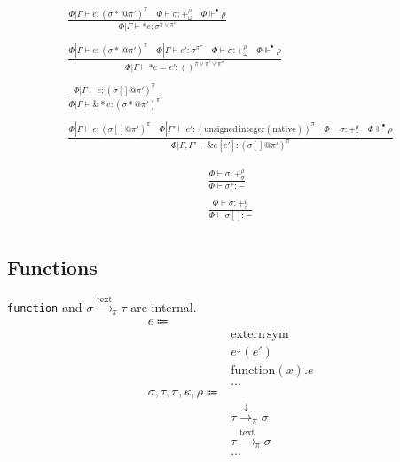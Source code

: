 \documentclass {article}
\begin{document}
\begin{gather*}
\frac
{\Phi | \Gamma \vdash e : (\sigma* \, @ \pi')^\pi \quad \Phi \vdash \sigma : +^\rho_\omega \quad
\Phi \Vdash^\bullet \rho}
{\Phi | \Gamma \vdash * e  : \sigma^{\pi \lor \pi'}} \\
\\
\frac
{\Phi | \Gamma \vdash e : (\sigma* \, @ \pi')^\pi \quad \Phi | \Gamma \vdash e' : \sigma^{\pi''} \quad
\Phi \vdash \sigma : +^\rho_\omega \quad
\Phi \Vdash^\bullet \rho}
{\Phi | \Gamma \vdash *e  = e' : ()^{\pi \lor \pi' \lor \pi''} } \\
\\
\frac
{\Phi | \Gamma \vdash e : (\sigma[] @ \pi') ^ \pi}
{\Phi | \Gamma \vdash \& * e : (\sigma * @ \pi') ^ \pi}\\
\\
\frac
{\Phi | \Gamma \vdash e : (\sigma [] @ \pi')^\pi \quad 
\Phi |  \Gamma' \vdash e' : (\text{unsigned} \, \text{integer}(\text{native}))^\pi \quad
\Phi \vdash \sigma : +^\rho_\tau \quad \Phi \Vdash^\bullet \rho}
{\Phi | \Gamma, \Gamma' \vdash \&e [e'] : (\sigma [] @  \pi')^\pi}
\end{gather*}

\begin{gather*}
\frac
{\Phi \vdash \sigma : +^{\rho}_\sigma}
{\Phi \vdash \sigma* : -} \\
\\
\frac
{\Phi \vdash \sigma : +^{\rho}_\sigma}
{\Phi \vdash \sigma [] : -} \\
\end{gather*}

\subsection{Functions}
\texttt{function} and $ \sigma \xrightarrow{\text{text}}_\pi \tau $ are internal.
\begin{align*}
e \Coloneqq & \\
& \text{extern} \, \text{sym} \tag{Extern Function} \\
& e ^\downarrow (e') \tag{Function Pointer Application} \\
& \text{function} (x). e \tag{Function Literal} \\
& \dots \\
\sigma, \tau, \pi, \kappa, \rho \Coloneqq & \\
& \tau \xrightarrow{\downarrow}_\pi \sigma \tag{Function Pointer}\\
& \tau \xrightarrow{\text{text}}_\pi \sigma  \tag{Function Literal Type} \\
& \dots
\end{align*}
\end{document}
